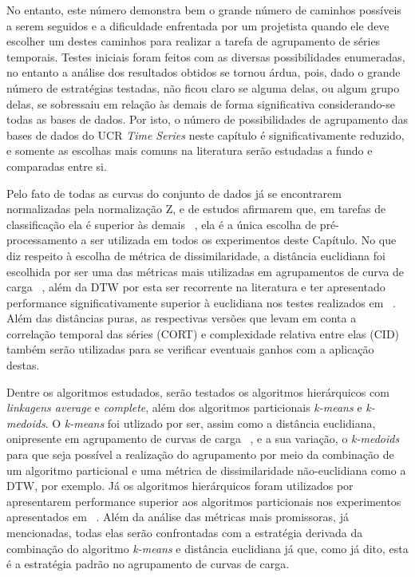  No entanto, este número demonstra bem o grande número de caminhos possíveis a serem seguidos e a dificuldade enfrentada por um projetista quando ele deve escolher um destes caminhos para realizar a tarefa de agrupamento de séries temporais. Testes iniciais foram feitos com as diversas possibilidades enumeradas, no entanto a análise dos resultados obtidos se tornou árdua, pois, dado o grande número de estratégias testadas, não ficou claro se alguma delas, ou algum grupo delas, se sobressaiu em relação às demais de forma significativa considerando-se todas as bases de dados. Por isto, o número de possibilidades de agrupamento das bases de dados do UCR \emph{Time Series} neste capítulo é significativamente reduzido, e somente as escolhas mais comuns na literatura serão estudadas a fundo e comparadas entre si. 
 
 Pelo fato de todas as curvas do conjunto de dados já se encontrarem normalizadas pela normalização Z, e de estudos afirmarem que, em tarefas de classificação ela é superior às demais ~\parencite{trillions}, ela é a única escolha de pré-processamento a ser utilizada em todos os experimentos deste Capítulo. No que diz respeito à escolha de métrica de dissimilaridade, a distância euclidiana foi escolhida por ser uma das métricas mais utilizadas em agrupamentos de curva de carga ~\parencite{Chicco}, além da DTW por esta ser recorrente na literatura e ter apresentado performance significativamente superior à euclidiana nos testes realizados em ~\parencite{BatistaComparativo}. Além das distâncias puras, as respectivas versões que levam em conta a correlação temporal das séries (CORT) e complexidade relativa entre elas (CID) também serão utilizadas para se verificar eventuais ganhos com a aplicação destas.
 
Dentre os algoritmos estudados, serão testados os algoritmos hierárquicos com \emph{linkagens average} e \emph{complete}, além dos algoritmos particionais \emph{k-means} e \emph{k-medoids}. O \emph{k-means} foi utlizado por ser, assim como a distância euclidiana, onipresente em agrupamento de curvas de carga ~\parencite{Chicco}, e a sua variação, o \emph{k-medoids} para que seja possível a realização do agrupamento por meio da combinação de um algoritmo particional e uma métrica de dissimilaridade não-euclidiana como a DTW, por exemplo. Já os algoritmos hierárquicos foram utilizados por apresentarem performance superior aos algoritmos particionais nos experimentos apresentados em ~\parencite{k_shape}. Além da análise das métricas mais promissoras, já mencionadas, todas elas serão confrontadas com a estratégia derivada da combinação do algoritmo \emph{k-means} e distância euclidiana já que, como já dito, esta é a estratégia padrão no agrupamento de curvas de carga.

